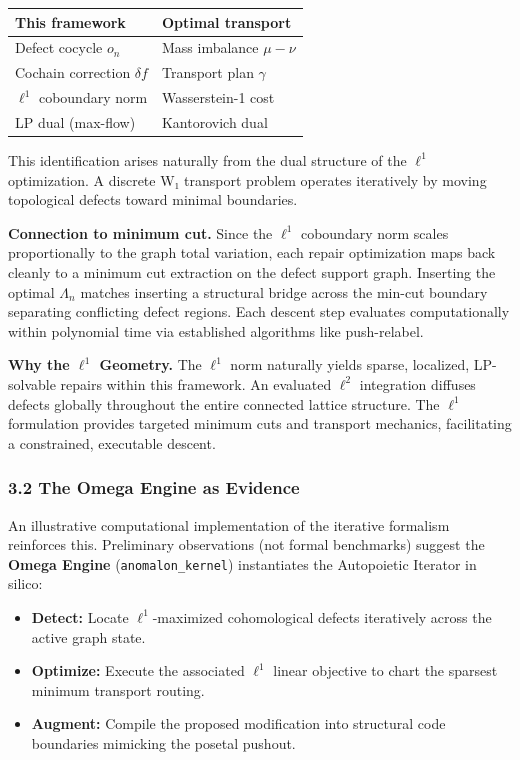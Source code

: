 \documentclass[
]{article}
\providecommand{\tightlist}{%
  \setlength{\itemsep}{0pt}\setlength{\parskip}{0pt}}
\begin{document}
\begin{longtable}[]{@{}ll@{}}
\toprule\noalign{}
This framework & Optimal transport \\
\midrule\noalign{}
\endhead
\bottomrule\noalign{}
\endlastfoot
Defect cocycle \(o_n\) & Mass imbalance \(\mu - \nu\) \\
Cochain correction \(\delta f\) & Transport plan \(\gamma\) \\
\(\ell^1\) coboundary norm & Wasserstein-1 cost \\
LP dual (max-flow) & Kantorovich dual \\
\end{longtable}

This identification arises naturally from the dual structure of the
\(\ell^1\) optimization. A discrete W₁ transport problem operates
iteratively by moving topological defects toward minimal boundaries.

\textbf{Connection to minimum cut.} Since the \(\ell^1\) coboundary norm
scales proportionally to the graph total variation, each repair
optimization maps back cleanly to a minimum cut extraction on the defect
support graph. Inserting the optimal \(\Lambda_n\) matches inserting a
structural bridge across the min-cut boundary separating conflicting
defect regions. Each descent step evaluates computationally within
polynomial time via established algorithms like push-relabel.

\textbf{Why the \(\ell^1\) Geometry.} The \(\ell^1\) norm naturally
yields sparse, localized, LP-solvable repairs within this framework. An
evaluated \(\ell^2\) integration diffuses defects globally throughout
the entire connected lattice structure. The \(\ell^1\) formulation
provides targeted minimum cuts and transport mechanics, facilitating a
constrained, executable descent.

\subsubsection{3.2 The Omega Engine as
Evidence}\label{the-omega-engine-as-evidence}

An illustrative computational implementation of the iterative formalism
reinforces this. Preliminary observations (not formal benchmarks)
suggest the \textbf{Omega Engine} (\texttt{anomalon\_kernel})
instantiates the Autopoietic Iterator in silico:

\begin{itemize}
\tightlist
\item
  \textbf{Detect:} Locate \(\ell^1\)-maximized cohomological defects
  iteratively across the active graph state.
\item
  \textbf{Optimize:} Execute the associated \(\ell^1\) linear objective
  to chart the sparsest minimum transport routing.
\item
  \textbf{Augment:} Compile the proposed modification into structural
  code boundaries mimicking the posetal pushout.
\end{itemize}
\end{document}
